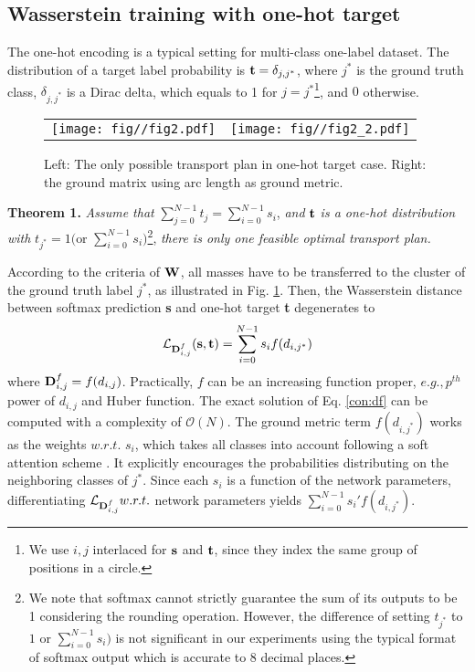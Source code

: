 \subsection{Wasserstein training with one-hot target}



The one-hot encoding is a typical setting for multi-class one-label dataset. The distribution of a target label probability is ${\rm\textbf{t}}=\delta_{j,j^*}$, where $j^*$ is the ground truth class, $\delta_{j,j^*}$ is a Dirac delta, which equals to 1 for $j=j^*$\footnote{\noindent We use $i,j$ interlaced for ${\rm \textbf{s}}$ and ${\rm \textbf{t}}$, since they index the same group of positions in a circle.}, and $0$ otherwise. 

\begin{figure}[t]
\centering
\begin{tabular}{cc}
\texttt{[image: fig//fig2.pdf]}&\texttt{[image: fig//fig2\_2.pdf]}
\end{tabular}
\caption{Left: The only possible transport plan in one-hot target case. Right: the ground matrix using arc length as ground metric.}
\label{fig:2}
\end{figure} 

\noindent\textbf{Theorem 1.} \textit{Assume that} $\sum_{j=0}^{N-1}t_j=\sum_{i=0}^{N-1}s_i$, \textit{and} ${\rm{\textbf{t}}}$ \textit{is a one-hot distribution with} $t_{j^*}=1 ($or $\sum_{i=0}^{N-1}s_i)$\footnote{We note that softmax cannot strictly guarantee the sum of its outputs to be 1 considering the rounding operation. However, the difference of setting $t_{j^*}$ to $1$ or $\sum_{i=0}^{N-1}s_i)$ is not significant in our experiments using the typical format of softmax output which is accurate to 8 decimal places.}, \textit{there is only one feasible optimal transport plan.} 



According to the criteria of ${\rm\textbf{W}}$, all masses have to be transferred to the cluster of the ground truth label $j^*$, as illustrated in Fig. \ref{fig:2}. Then, the Wasserstein distance between softmax prediction {\rm{\textbf{s}}} and one-hot target {\rm{\textbf{t}}} degenerates to\begin{equation}
\mathcal{L}_{{\rm\textbf{D}}_{i,j}^{f}}({\rm{\textbf{s},\textbf{t}}})=\sum_{i=0}^{N-1} s_i f(d_{i,j^*}) \label{con:df}
\end{equation} where ${\rm\textbf{D}}_{i,j}^f=f(d_{i,j})$. Practically, $f$ can be an increasing function proper, $e.g., p^{th}$ power of $d_{i,j}$ and Huber function. The exact solution of Eq. \eqref{con:df} can be computed with a complexity of $\mathcal{O}(N)$. The ground metric term $f(d_{i,j^*})$ works as the weights $w.r.t.$ $s_i$, which takes all classes into account following a soft attention scheme \cite{liu2018dependency,liu2019dependency,liu2019permutation}. It explicitly encourages the probabilities distributing on the neighboring classes of $j^*$. Since each $s_i$ is a function of the network parameters, differentiating $\mathcal{L}_{{\rm\textbf{D}}_{i,j}^{f}} w.r.t.$ network parameters yields $\sum_{i=0}^{N-1}s_i'f(d_{i,j^*})$.    



